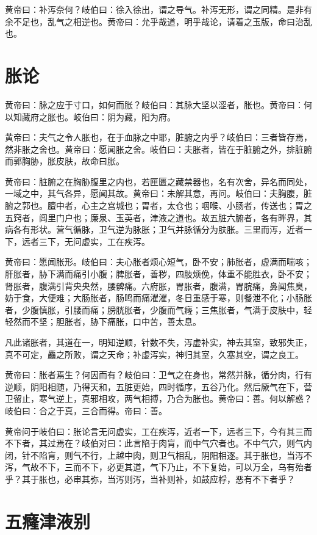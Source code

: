 \documentclass[12pt,UTF8]{ctexbook}
\begin{document}
	黄帝曰：补泻奈何？岐伯曰：徐入徐出，谓之导气。补泻无形，谓之同精。是非有余不足也，乱气之相逆也。黄帝曰：允乎哉道，明乎哉论，请着之玉版，命曰治乱也。
	\chapter{胀论}
	
	黄帝曰：脉之应于寸口，如何而胀？岐伯曰：其脉大坚以涩者，胀也。黄帝曰：何以知藏府之胀也。岐伯曰：阴为藏，阳为府。
	
	黄帝曰：夫气之令人胀也，在于血脉之中耶，脏腑之内乎？岐伯曰：三者皆存焉，然非胀之舍也。黄帝曰：愿闻胀之舍。岐伯曰：夫胀者，皆在于脏腑之外，排脏腑而郭胸胁，胀皮肤，故命曰胀。
	
	黄帝曰：脏腑之在胸胁腹里之内也，若匣匮之藏禁器也，名有次舍，异名而同处，一域之中，其气各异，愿闻其故。黄帝曰：未解其意，再问。岐伯曰：夫胸腹，脏腑之郭也。膻中者，心主之宫城也；胃者，太仓也；咽喉、小肠者，传送也；胃之五窍者，闾里门户也；廉泉、玉英者，津液之道也。故五脏六腑者，各有畔界，其病各有形状。营气循脉，卫气逆为脉胀；卫气并脉循分为肤胀。三里而泻，近者一下，远者三下，无问虚实，工在疾泻。
	
	黄帝曰：愿闻胀形。岐伯曰：夫心胀者烦心短气，卧不安；肺胀者，虚满而喘咳；肝胀者，胁下满而痛引小腹；脾胀者，善秽，四肢烦俛，体重不能胜衣，卧不安；肾胀者，腹满引背央央然，腰髀痛。六府胀，胃胀者，腹满，胃脘痛，鼻闻焦臭，妨于食，大便难；大肠胀者，肠鸣而痛濯濯，冬日重感于寒，则餐泄不化；小肠胀者，少腹慎胀，引腰而痛；膀胱胀者，少腹而气癃；三焦胀者，气满于皮肤中，轻轻然而不坚；胆胀者，胁下痛胀，口中苦，善太息。
	
	凡此诸胀者，其道在一，明知逆顺，针数不失，泻虚补实，神去其室，致邪失正，真不可定，麤之所败，谓之天命；补虚泻实，神归其室，久塞其空，谓之良工。
	
	黄帝曰：胀者焉生？何因而有？岐伯曰：卫气之在身也，常然并脉，循分肉，行有逆顺，阴阳相随，乃得天和，五脏更始，四时循序，五谷乃化。然后厥气在下，营卫留止，寒气逆上，真邪相攻，两气相搏，乃合为胀也。黄帝曰：善。何以解惑？岐伯曰：合之于真，三合而得。帝曰：善。
	
	黄帝问于岐伯曰：胀论言无问虚实，工在疾泻，近者一下，远者三下，今有其三而不下者，其过焉在？岐伯对曰：此言陷于肉肓，而中气穴者也。不中气穴，则气内闭，针不陷肓，则气不行，上越中肉，则卫气相乱，阴阳相逐。其于胀也，当泻不泻，气故不下，三而不下，必更其道，气下乃止，不下复始，可以万全，乌有殆者乎？其于胀也，必审其弥，当泻则泻，当补则补，如鼓应桴，恶有不下者乎？
	\chapter{五癃津液别}
	
\end{document}
